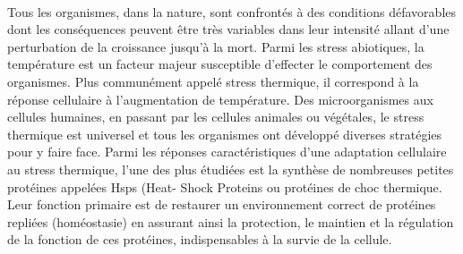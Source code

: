 

\paragraph{} %
\label{par:intro1}

Tous les organismes, dans la nature, sont confrontés à des conditions défavorables dont les conséquences peuvent être très variables dans leur intensité allant d'une perturbation de la croissance jusqu'à la mort.
Parmi les stress abiotiques, la température est un facteur majeur susceptible d'effecter le comportement des organismes.
Plus communément appelé stress thermique, il correspond à la réponse cellulaire à l'augmentation de température.
Des microorganismes aux cellules humaines, en passant par les cellules animales ou végétales, le stress thermique est universel et tous les organismes ont développé diverses stratégies pour y faire face.
Parmi les réponses caractéristiques d'une adaptation cellulaire au stress thermique, l'une des plus étudiées est la synthèse de nombreuses petites protéines appelées Hsps (Heat- Shock Proteins ou protéines de choc thermique.
Leur fonction primaire est de restaurer un environnement correct de protéines repliées (homéostasie) en assurant ainsi la protection, le maintien et la régulation de la fonction de ces protéines, indispensables à la  survie de la cellule.


